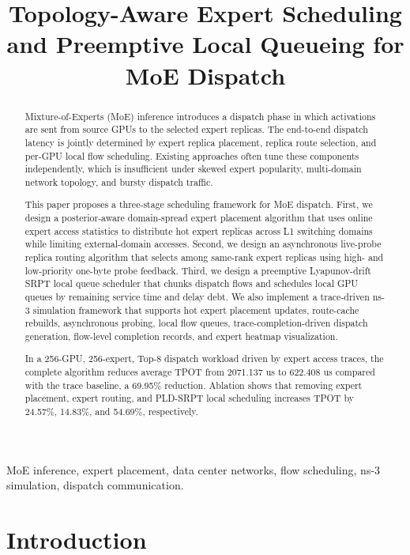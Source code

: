 \documentclass[10pt,conference]{IEEEtran}
\title{Topology-Aware Expert Scheduling and Preemptive Local Queueing for MoE Dispatch}
\author{
\IEEEauthorblockN{Anonymous Authors}
\IEEEauthorblockA{Paper draft prepared for INFOCOM-style submission}
}
\begin{document}
\maketitle

\begin{abstract}
Mixture-of-Experts (MoE) inference introduces a dispatch phase in which activations are sent from source GPUs to the selected expert replicas. The end-to-end dispatch latency is jointly determined by expert replica placement, replica route selection, and per-GPU local flow scheduling. Existing approaches often tune these components independently, which is insufficient under skewed expert popularity, multi-domain network topology, and bursty dispatch traffic.

This paper proposes a three-stage scheduling framework for MoE dispatch. First, we design a posterior-aware domain-spread expert placement algorithm that uses online expert access statistics to distribute hot expert replicas across L1 switching domains while limiting external-domain accesses. Second, we design an asynchronous live-probe replica routing algorithm that selects among same-rank expert replicas using high- and low-priority one-byte probe feedback. Third, we design a preemptive Lyapunov-drift SRPT local queue scheduler that chunks dispatch flows and schedules local GPU queues by remaining service time and delay debt. We also implement a trace-driven ns-3 simulation framework that supports hot expert placement updates, route-cache rebuilds, asynchronous probing, local flow queues, trace-completion-driven dispatch generation, flow-level completion records, and expert heatmap visualization.

In a 256-GPU, 256-expert, Top-8 dispatch workload driven by expert access traces, the complete algorithm reduces average TPOT from 2071.137 us to 622.408 us compared with the trace baseline, a 69.95\% reduction. Ablation shows that removing expert placement, expert routing, and PLD-SRPT local scheduling increases TPOT by 24.57\%, 14.83\%, and 54.69\%, respectively.
\end{abstract}

\begin{IEEEkeywords}
MoE inference, expert placement, data center networks, flow scheduling, ns-3 simulation, dispatch communication.
\end{IEEEkeywords}

\section{Introduction}
\end{document}
